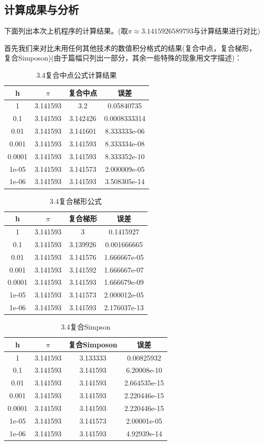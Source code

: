 \documentclass[10pt,a4paper]{ctexart}
\begin{document}
\subsection{计算成果与分析}
下面列出本次上机程序的计算结果。(取$\pi\approx3.1415926589793$与计算结果进行对比)

首先我们来对比未用任何其他技术的数值积分格式的结果(复合中点，复合梯形，复合Simposon)(由于篇幅只列出一部分，其余一些特殊的现象用文字描述)：
\begin{center}
\begin{longtable}{|c|c|cc|}
\caption{3.4复合中点公式计算结果}\\
\hline
h& $\pi$& 复合中点& 误差\\
\hline
1& 3.141593& 3.2& 0.05840735\\
\hline
0.1& 3.141593& 3.142426& 0.0008333314\\
\hline
0.01& 3.141593& 3.141601& 8.333333e-06\\
\hline
0.001& 3.141593& 3.141593& 8.333334e-08\\
\hline
0.0001& 3.141593& 3.141593& 8.333352e-10\\
\hline
1e-05& 3.141593& 3.141573& 2.000009e-05\\
\hline
1e-06& 3.141593& 3.141593& 3.508305e-14\\
\hline
\end{longtable}
\begin{longtable}{|c|c|cc|}
\caption{3.4复合梯形公式}\\
\hline
h& $\pi$& 复合梯形& 误差\\
\hline
1& 3.141593& 3& 0.1415927\\
\hline
0.1& 3.141593& 3.139926& 0.001666665\\
\hline
0.01& 3.141593& 3.141576& 1.666667e-05\\
\hline
0.001& 3.141593& 3.141592& 1.666667e-07\\
\hline
0.0001& 3.141593& 3.141593& 1.666679e-09\\
\hline
1e-05& 3.141593& 3.141573& 2.000012e-05\\
\hline
1e-06& 3.141593& 3.141593& 2.176037e-13\\
\hline
\end{longtable}
\begin{longtable}{|c|c|cc|}
\caption{3.4复合Simpson}\\
\hline
h& $\pi$& 复合Simposon& 误差\\
\hline
1& 3.141593& 3.133333& 0.00825932\\
\hline
0.1& 3.141593& 3.141593& 6.20008e-10\\
\hline
0.01& 3.141593& 3.141593& 2.664535e-15\\
\hline
0.001& 3.141593& 3.141593& 2.220446e-15\\
\hline
0.0001& 3.141593& 3.141593& 2.220446e-15\\
\hline
1e-05& 3.141593& 3.141573& 2.00001e-05\\
\hline
1e-06& 3.141593& 3.141593& 4.92939e-14\\
\hline
\end{longtable}
\end{center}
\end{document}
